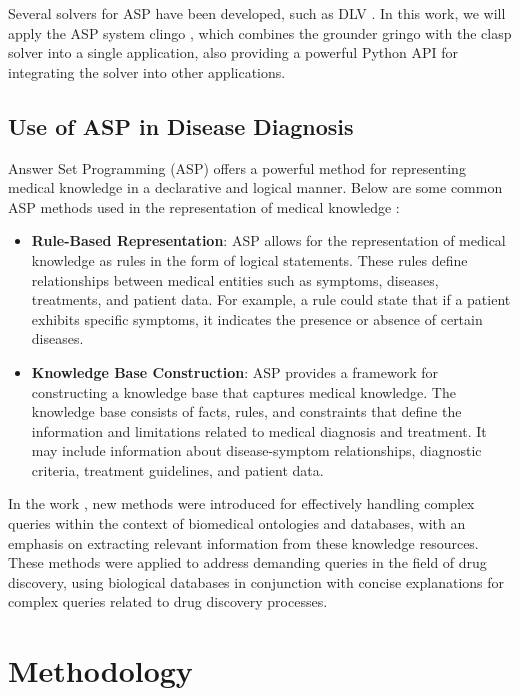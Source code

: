 \documentclass[10pt,leqno]{amsart}
\begin{document}
Several solvers for ASP have been developed, such as DLV \cite{Xia2020}. In this work, we will apply the ASP system clingo \cite{Gebser2014}, which combines the grounder gringo with the clasp solver \cite{Holldobler2014} into a single application, also providing a powerful Python API for integrating the solver into other applications.

\subsection{Use of ASP in Disease Diagnosis}
Answer Set Programming (ASP) offers a powerful method for representing medical knowledge in a declarative and logical manner. Below are some common ASP methods used in the representation of medical knowledge \cite{Vinarti2019}:

\begin{itemize}
    \item \textbf{Rule-Based Representation}: ASP allows for the representation of medical knowledge as rules in the form of logical statements. These rules define relationships between medical entities such as symptoms, diseases, treatments, and patient data. For example, a rule could state that if a patient exhibits specific symptoms, it indicates the presence or absence of certain diseases.
    \item \textbf{Knowledge Base Construction}: ASP provides a framework for constructing a knowledge base that captures medical knowledge. The knowledge base consists of facts, rules, and constraints that define the information and limitations related to medical diagnosis and treatment. It may include information about disease-symptom relationships, diagnostic criteria, treatment guidelines, and patient data.
\end{itemize}

In the work \cite{Erdem2011}, new methods were introduced for effectively handling complex queries within the context of biomedical ontologies and databases, with an emphasis on extracting relevant information from these knowledge resources. These methods were applied to address demanding queries in the field of drug discovery, using biological databases in conjunction with concise explanations for complex queries related to drug discovery processes.

\section{Methodology}
\end{document}
